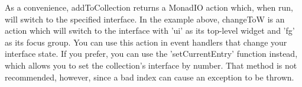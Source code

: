 As a convenience, addToCollection returns a MonadIO action which, when
run, will switch to the specified interface.  In the example above,
changeToW is an action which will switch to the interface with 'ui' as
its top-level widget and 'fg' as its focus group.  You can use this
action in event handlers that change your interface state.  If you
prefer, you can use the 'setCurrentEntry' function instead, which
allows you to set the collection's interface by number.  That method
is not recommended, however, since a bad index can cause an exception
to be thrown.
